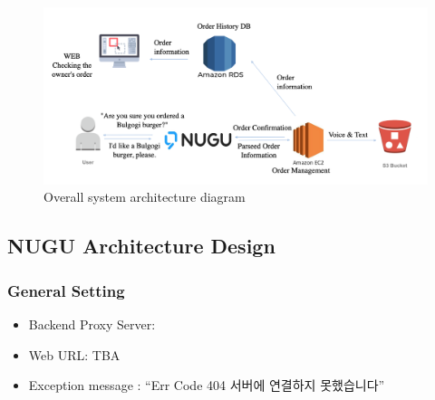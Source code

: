 \documentclass[conference,compsoc]{IEEEtran}
\begin{document}
\begin{figure}[ht!]
  \includegraphics[width=\linewidth]{figures/architecture.png}
  \caption{Overall system architecture diagram}
  \label{fig:architecture}
\end{figure}

\subsection{NUGU Architecture Design}

\subsubsection{General Setting}
\begin{itemize}
  \item Backend Proxy Server:
  \item Web URL: TBA
  \item Exception message : “Err Code 404 서버에 연결하지 못했습니다”
\end{itemize}
\end{document}
